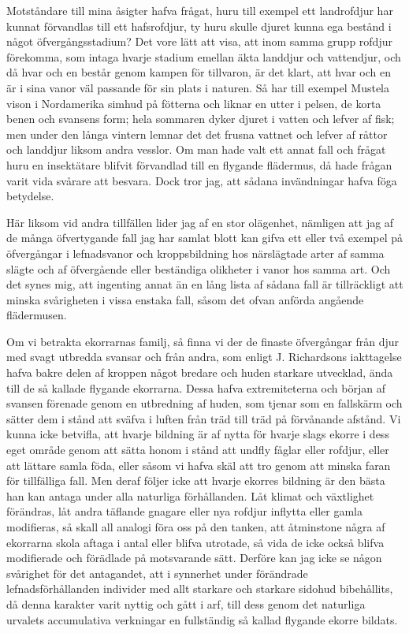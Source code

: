 Motståndare till mina åsigter hafva frågat, huru till exempel ett landrofdjur har kunnat förvandlas till ett hafsrofdjur, ty huru skulle djuret kunna ega bestånd i något öfvergångsstadium? Det vore lätt att visa, att inom samma grupp rofdjur förekomma, som intaga hvarje stadium emellan äkta landdjur och vattendjur, och då hvar och en består genom kampen för tillvaron, är det klart, att hvar och en är i sina vanor väl passande för sin plats i naturen. Så har till exempel Mustela vison i Nordamerika simhud på fötterna och liknar en utter i pelsen, de korta benen och svansens form; hela sommaren dyker djuret i vatten och lefver af fisk; men under den långa vintern lemnar det det frusna vattnet och lefver af råttor och landdjur liksom andra vesslor. Om man hade valt ett annat fall och frågat huru en insektätare blifvit förvandlad till en flygande flädermus, då hade frågan varit vida svårare att besvara. Dock tror jag, att sådana invändningar hafva föga betydelse.

Här liksom vid andra tillfällen lider jag af en stor olägenhet, nämligen att jag af de många öfvertygande fall jag har samlat blott kan gifva ett eller två exempel på öfvergångar i lefnadsvanor och kroppsbildning hos närslägtade arter af samma slägte och af öfvergående eller beständiga olikheter i vanor hos samma art. Och det synes mig, att ingenting annat än en lång lista af sådana fall är tillräckligt att minska svårigheten i vissa enstaka fall, såsom det ofvan anförda angående flädermusen.

Om vi betrakta ekorrarnas familj, så finna vi der de finaste öfvergångar från djur med svagt utbredda svansar och från andra, som enligt J. Richardsons iakttagelse hafva bakre delen af kroppen något bredare och huden starkare utvecklad, ända till de så kallade flygande ekorrarna. Dessa hafva extremiteterna och början af svansen förenade genom en utbredning af huden, som tjenar som en fallskärm och sätter dem i stånd att sväfva i luften från träd till träd på förvånande afstånd. Vi kunna icke betvifla, att hvarje bildning är af nytta för hvarje slags ekorre i dess eget område genom att sätta honom i stånd att undfly fåglar eller rofdjur, eller att lättare samla föda, eller såsom vi hafva skäl att tro genom att minska faran för tillfälliga fall. Men deraf följer icke att hvarje ekorres bildning är den bästa han kan antaga under alla naturliga förhållanden. Låt klimat och växtlighet förändras, låt andra täflande gnagare eller nya rofdjur inflytta eller gamla modifieras, så skall all analogi föra oss på den tanken, att åtminstone några af ekorrarna skola aftaga i antal eller blifva utrotade, så vida de icke också blifva modifierade och förädlade på motsvarande sätt. Derföre kan jag icke se någon svårighet för det antagandet, att i synnerhet under förändrade lefnadsförhållanden individer med allt starkare och starkare sidohud bibehållits, då denna karakter varit nyttig och gått i arf, till dess genom det naturliga urvalets accumulativa verkningar en fullständig så kallad flygande ekorre bildats.

